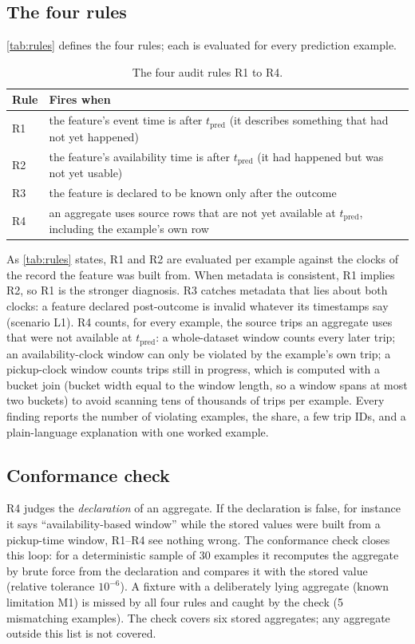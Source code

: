 \documentclass[11pt,a4paper]{article}
\newcommand{\tpred}{$t_{\mathrm{pred}}$}
\begin{document}
\subsection{The four rules}
\autoref{tab:rules} defines the four rules; each is evaluated for every prediction example.
\begin{table}[H]
\centering\small
\caption{The four audit rules R1 to R4.}
\label{tab:rules}
\begin{tabular}{@{}lp{11.5cm}@{}}
\toprule
Rule & Fires when \\
\midrule
R1 & the feature's event time is after \tpred{} (it describes something that had not yet happened) \\
R2 & the feature's availability time is after \tpred{} (it had happened but was not yet usable) \\
R3 & the feature is declared to be known only after the outcome \\
R4 & an aggregate uses source rows that are not yet available at \tpred{}, including the example's own row \\
\bottomrule
\end{tabular}
\end{table}
As \autoref{tab:rules} states, R1 and R2 are evaluated per example against the clocks of the record the feature was built from. When metadata is consistent, R1 implies R2, so R1 is the stronger diagnosis. R3 catches metadata that lies about both clocks: a feature declared post-outcome is invalid whatever its timestamps say (scenario L1). R4 counts, for every example, the source trips an aggregate uses that were not available at \tpred{}: a whole-dataset window counts every later trip; an availability-clock window can only be violated by the example's own trip; a pickup-clock window counts trips still in progress, which is computed with a bucket join (bucket width equal to the window length, so a window spans at most two buckets) to avoid scanning tens of thousands of trips per example. Every finding reports the number of violating examples, the share, a few trip IDs, and a plain-language explanation with one worked example.

\subsection{Conformance check}
R4 judges the \emph{declaration} of an aggregate. If the declaration is false, for instance it says ``availability-based window'' while the stored values were built from a pickup-time window, R1--R4 see nothing wrong. The conformance check closes this loop: for a deterministic sample of 30 examples it recomputes the aggregate by brute force from the declaration and compares it with the stored value (relative tolerance $10^{-6}$). A fixture with a deliberately lying aggregate (known limitation M1) is missed by all four rules and caught by the check (5 mismatching examples). The check covers six stored aggregates; any aggregate outside this list is not covered.
\end{document}

